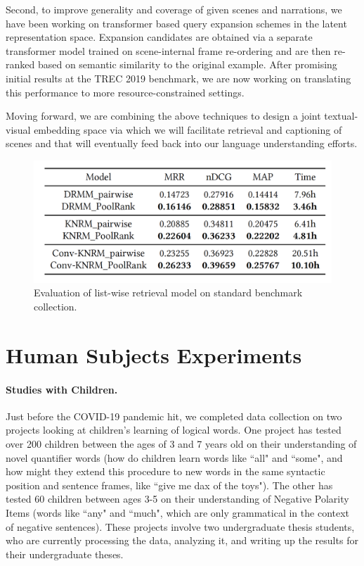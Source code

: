 \documentclass[11pt]{article}
\begin{document}
Second, to improve generality and coverage of given scenes and narrations, we have been working on transformer based query expansion schemes in the latent representation space. Expansion candidates are obtained via a separate transformer model trained on scene-internal frame re-ordering and are then re-ranked based on semantic similarity to the original example. After promising initial results at the TREC 2019 benchmark, we are now working on translating this performance to more resource-constrained settings.

Moving forward, we are combining the above techniques to design a joint textual-visual embedding space via which we will facilitate retrieval and captioning of scenes and that will eventually feed back into our language understanding efforts. 

\begin{figure}[ht!]
\centering
\includegraphics[width=.6\linewidth]{figures/ir-table}
\caption{Evaluation of list-wise retrieval model on standard benchmark collection.}
\label{fig:ir}
\end{figure}


\section{Human Subjects Experiments} 
\label{sec:hsr}

\paragraph{Studies with Children.} Just before the COVID-19 pandemic hit, we completed data collection on two projects looking at children's learning of logical words. One project has tested over 200 children between the ages of 3 and 7 years old on their understanding of novel quantifier words (how do children learn words like ``all" and ``some", and how might they extend this procedure to new words in the same syntactic position and sentence frames, like ``give me dax of the toys"). The other has tested 60 children between ages 3-5 on their understanding of Negative Polarity Items (words like ``any" and ``much", which are only grammatical in the context of negative sentences). These projects involve two undergraduate thesis students, who are currently processing the data, analyzing it, and writing up the results for their undergraduate theses.
\end{document}
